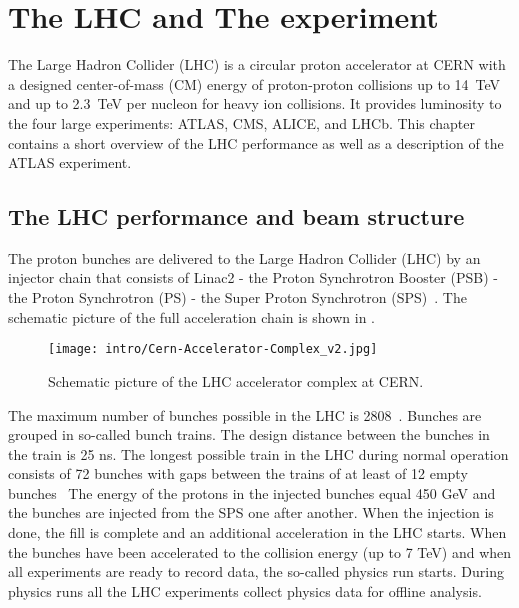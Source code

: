 

\chapter{The LHC and The \ATLAS experiment}
\label{chap:MoreStuff}

The Large Hadron Collider (LHC) is a circular proton accelerator at CERN with a designed center-of-mass (CM) energy of proton-proton collisions up to 14~TeV and up to 2.3~TeV per nucleon for heavy ion collisions.
It provides luminosity to the four large experiments: ATLAS, CMS, ALICE, and LHCb. This chapter contains a short overview of the LHC performance as well as a description of the ATLAS experiment.

\section{The LHC performance and beam structure}

The proton bunches are delivered to the Large Hadron Collider (LHC) 
by an injector chain that consists of Linac2 - the Proton Synchrotron Booster (PSB) - the Proton Synchrotron (PS) - the Super Proton Synchrotron (SPS)~\cite{lhc_tdr_vol3}.
The schematic picture of the full acceleration chain is shown in .

\begin{figure}[]
  \centering
\texttt{[image: intro/Cern-Accelerator-Complex\_v2.jpg]}
\caption{Schematic picture of the LHC accelerator complex at CERN.}
\label{fig:accelerator_complex}
\end{figure}

The maximum number of bunches possible in the LHC is 2808~\cite{lhc_tdr_vol1}.
Bunches are grouped in so-called bunch trains.
The design distance between the bunches in the train is 25 ns.
The longest possible train in the LHC during normal operation consists of 72 bunches with gaps between the trains of at least of 12 empty bunches~\cite{lhc_tdr_vol3} 
The energy of the protons in the injected bunches equal 450 GeV and the bunches are injected from the SPS one after another. 
When the injection is done, the fill is complete and an additional acceleration in the LHC starts.
When the bunches have been accelerated to the collision energy (up to 7 TeV) and when all experiments are ready to record data, the so-called physics run starts. During physics runs all the LHC experiments collect physics data for offline analysis. 

